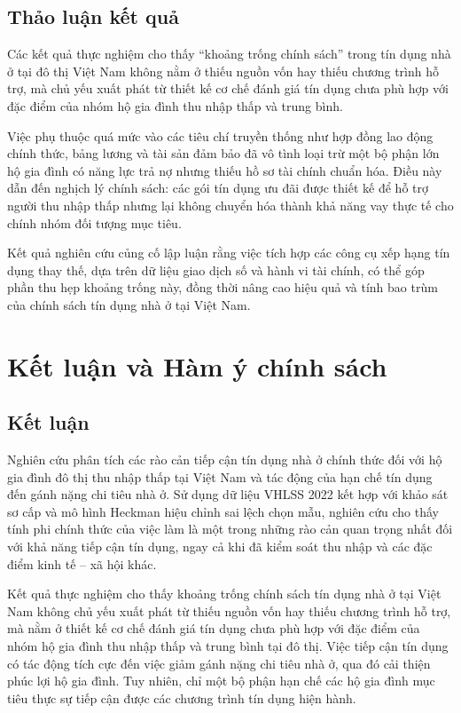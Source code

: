 \documentclass[12pt,a4paper]{report}
\begin{document}
\section{Thảo luận kết quả}

Các kết quả thực nghiệm cho thấy ``khoảng trống chính sách'' trong tín dụng nhà ở tại đô thị Việt Nam không nằm ở thiếu nguồn vốn hay thiếu chương trình hỗ trợ, mà chủ yếu xuất phát từ thiết kế cơ chế đánh giá tín dụng chưa phù hợp với đặc điểm của nhóm hộ gia đình thu nhập thấp và trung bình.

Việc phụ thuộc quá mức vào các tiêu chí truyền thống như hợp đồng lao động chính thức, bảng lương và tài sản đảm bảo đã vô tình loại trừ một bộ phận lớn hộ gia đình có năng lực trả nợ nhưng thiếu hồ sơ tài chính chuẩn hóa. Điều này dẫn đến nghịch lý chính sách: các gói tín dụng ưu đãi được thiết kế để hỗ trợ người thu nhập thấp nhưng lại không chuyển hóa thành khả năng vay thực tế cho chính nhóm đối tượng mục tiêu.

Kết quả nghiên cứu củng cố lập luận rằng việc tích hợp các công cụ xếp hạng tín dụng thay thế, dựa trên dữ liệu giao dịch số và hành vi tài chính, có thể góp phần thu hẹp khoảng trống này, đồng thời nâng cao hiệu quả và tính bao trùm của chính sách tín dụng nhà ở tại Việt Nam.

	\chapter{Kết luận và Hàm ý chính sách}
	
	\section{Kết luận}
	
	Nghiên cứu phân tích các rào cản tiếp cận tín dụng nhà ở chính thức đối với hộ gia đình đô thị thu nhập thấp tại Việt Nam và tác động của hạn chế tín dụng đến gánh nặng chi tiêu nhà ở. Sử dụng dữ liệu VHLSS 2022 kết hợp với khảo sát sơ cấp và mô hình Heckman hiệu chỉnh sai lệch chọn mẫu, nghiên cứu cho thấy tính phi chính thức của việc làm là một trong những rào cản quan trọng nhất đối với khả năng tiếp cận tín dụng, ngay cả khi đã kiểm soát thu nhập và các đặc điểm kinh tế – xã hội khác.
	
	Kết quả thực nghiệm cho thấy khoảng trống chính sách tín dụng nhà ở tại Việt Nam không chủ yếu xuất phát từ thiếu nguồn vốn hay thiếu chương trình hỗ trợ, mà nằm ở thiết kế cơ chế đánh giá tín dụng chưa phù hợp với đặc điểm của nhóm hộ gia đình thu nhập thấp và trung bình tại đô thị. Việc tiếp cận tín dụng có tác động tích cực đến việc giảm gánh nặng chi tiêu nhà ở, qua đó cải thiện phúc lợi hộ gia đình. Tuy nhiên, chỉ một bộ phận hạn chế các hộ gia đình mục tiêu thực sự tiếp cận được các chương trình tín dụng hiện hành.
	
\end{document}
